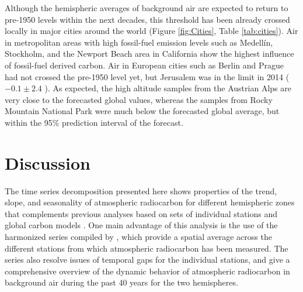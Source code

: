Although the hemispheric averages of background air are expected to return to pre-1950 levels within the next decades, this threshold has been already crossed locally in major cities around the world (Figure \ref{fig:Cities}, Table \ref{tab:cities}). Air in metropolitan areas with high fossil-fuel emission levels such as Medell\'in, Stockholm, and the Newport Beach area in California show the highest influence of fossil-fuel derived carbon. 
Air in European cities such as Berlin and Prague had not crossed the pre-1950 level yet, but Jerusalem was in the limit in 2014 ($-0.1 \pm 2.4$ \permil). As expected, the high altitude samples from the Austrian Alps are very close to the forecasted global values, whereas the samples from Rocky Mountain National Park were much below the forecasted global average, but within the 95\% prediction interval of the forecast.



\section{Discussion}
The time series decomposition presented here shows properties of the trend, slope, and seasonality of atmospheric radiocarbon for different hemispheric zones that complements previous analyses based on sets of individual stations \citep{Levin2010Tellus, Graven2012JGR, Levin2013Tellus} and global carbon models \citep{Caldeira1998GRL, Randerson2002GBC, Turnbull2009JGR, Levin2010Tellus, Graven2015PNAS}. One main advantage of this analysis is the use of the harmonized series compiled by \citet{Hua2013Radiocarbon}, which provide a spatial average across the different stations from which atmospheric radiocarbon has been measured. The series also resolve issues of temporal gaps for the individual stations, and give a comprehensive overview of the dynamic behavior of atmospheric radiocarbon in background air during the past 40 years for the two hemispheres. 

